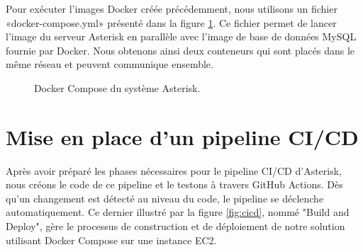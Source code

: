Pour exécuter l'images Docker créée précédemment, nous utilisons un fichier «docker-compose.yml» présenté dans la figure \ref{fig:dc3}. Ce fichier permet de lancer l'image du serveur Asterisk en parallèle avec l'image de base de données MySQL fournie par Docker. Nous obtenons ainsi deux conteneurs qui sont placés dans le même réseau et peuvent communique ensemble.
\begin{figure}[H]
        \centering
        \caption{Docker Compose du système Asterisk.}
        \label{fig:dc3}
        \end{figure}

\section{Mise en place d'un pipeline CI/CD}

Après avoir préparé les phases nécessaires pour le pipeline CI/CD d'Asterisk, nous créons le code de ce pipeline et le testons à travers GitHub Actions. Dès qu’un changement est détecté au niveau du code, le pipeline se déclenche automatiquement.
Ce dernier illustré par la figure \ref{fig:cicd}, nommé "Build and Deploy", gère le processus de construction et de déploiement de notre solution utilisant Docker Compose sur une instance EC2.

